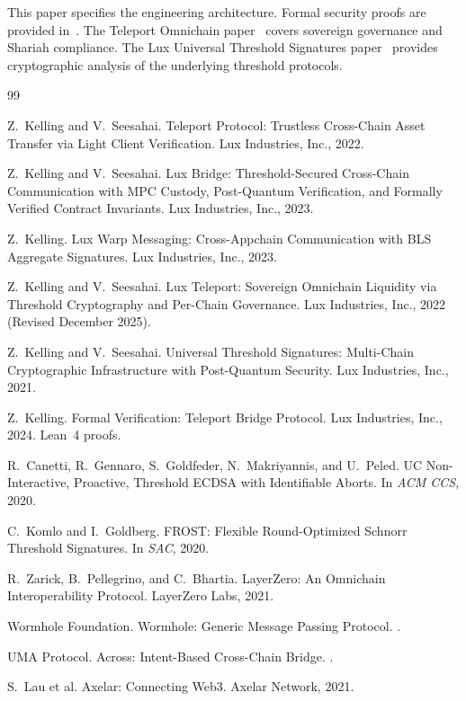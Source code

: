 \documentclass[11pt]{article}
\begin{document}
This paper specifies the engineering architecture. Formal security proofs are provided in~\cite{luxproof-teleport}. The Teleport Omnichain paper~\cite{luxtp-omni2025} covers sovereign governance and Shariah compliance. The Lux Universal Threshold Signatures paper~\cite{luxthreshold2025} provides cryptographic analysis of the underlying threshold protocols.



\begin{thebibliography}{99}

Z.~Kelling and V.~Seesahai.
\newblock Teleport Protocol: Trustless Cross-Chain Asset Transfer via Light Client Verification.
\newblock Lux Industries, Inc., 2022.

Z.~Kelling and V.~Seesahai.
\newblock Lux Bridge: Threshold-Secured Cross-Chain Communication with MPC Custody, Post-Quantum Verification, and Formally Verified Contract Invariants.
\newblock Lux Industries, Inc., 2023.

Z.~Kelling.
\newblock Lux Warp Messaging: Cross-Appchain Communication with BLS Aggregate Signatures.
\newblock Lux Industries, Inc., 2023.

Z.~Kelling and V.~Seesahai.
\newblock Lux Teleport: Sovereign Omnichain Liquidity via Threshold Cryptography and Per-Chain Governance.
\newblock Lux Industries, Inc., 2022 (Revised December 2025).

Z.~Kelling and V.~Seesahai.
\newblock Universal Threshold Signatures: Multi-Chain Cryptographic Infrastructure with Post-Quantum Security.
\newblock Lux Industries, Inc., 2021.

Z.~Kelling.
\newblock Formal Verification: Teleport Bridge Protocol.
\newblock Lux Industries, Inc., 2024. Lean~4 proofs.

R.~Canetti, R.~Gennaro, S.~Goldfeder, N.~Makriyannis, and U.~Peled.
\newblock UC Non-Interactive, Proactive, Threshold ECDSA with Identifiable Aborts.
\newblock In \emph{ACM CCS}, 2020.

C.~Komlo and I.~Goldberg.
\newblock FROST: Flexible Round-Optimized Schnorr Threshold Signatures.
\newblock In \emph{SAC}, 2020.

R.~Zarick, B.~Pellegrino, and C.~Bhartia.
\newblock LayerZero: An Omnichain Interoperability Protocol.
\newblock LayerZero Labs, 2021.

Wormhole Foundation.
\newblock Wormhole: Generic Message Passing Protocol.
.

UMA Protocol.
\newblock Across: Intent-Based Cross-Chain Bridge.
.

S.~Lau et al.
\newblock Axelar: Connecting Web3.
\newblock Axelar Network, 2021.

\end{thebibliography}
\end{document}
